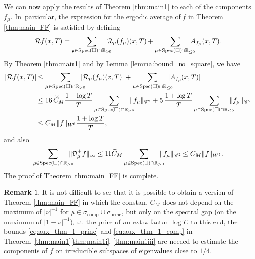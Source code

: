 \documentclass[JEP,XML,SOM,NoEqCountersInSection,Unicode,published]{cedram}
\newcommand \R{\mathbb{R}}
\newcommand{\Dpm}[1]{\mathcal{D}_\mu^{\pm} #1}
\DeclareMathOperator{\Spec}{Spec}
\DeclareMathOperator{\comp}{comp}
\DeclareMathOperator{\princ}{princ}
\theoremstyle{definition}
\newtheorem{remark}[theorem]{Remark}
\begin{document}
We can now apply the results of Theorem \ref{thm:main1} to each of the components $f_\mu$.
In~particular, the expression for the ergodic average of $f$ in Theorem \ref{thm:main_FF} is satisfied by defining
\[
\mathcal{R}f(x,T) = \sum_{\mu \in \Spec(\square) \cap \R_{>0}}\hspace*{-3mm} \mathcal{R}_\mu (f_\mu) (x, T) + \sum_{\mu \in \Spec(\square) \cap \R_{\leq 0}}\hspace*{-3mm} A_{f_\mu}(x,T).
\]
By Theorem \ref{thm:main1} and by Lemma \ref{lemma:bound_no_square}, we have
\begin{equation*}
\begin{split}
|\mathcal{R}f(x,T)|&\leq \sum_{\mu \in \Spec(\square) \cap \R_{>0}}\hspace*{-3mm} |\mathcal{R}_\mu (f_\mu)(x, T)|+ \sum_{\mu \in \Spec(\square) \cap \R_{\leq 0}}\hspace*{-3mm} |A_{f_\mu}(x,T)|\\
&\leq 16 \, {\widetilde C_M} \frac{1+ \log T}{T} \sum_{\mu \in \Spec(\square) \cap \R_{>0}}\hspace*{-3mm} \|f_\mu\|_{\mathscr{C}^2}+ 5\, \frac{1+\log T}{T} \sum_{\mu \in \Spec(\square) \cap \R_{\leq 0}}\hspace*{-3mm} \|f_\mu\|_{\mathscr{C}^2} \\
&\leq C_M\|f \|_{W^6} \frac{1+ \log T}{T},
\end{split}
\end{equation*}
and also
\[
\sum_{\mu \in \Spec(\square) \cap \R_{>0}}\hspace*{-3mm} \|\Dpm{f}\|_{\infty} \leq 11 {\widetilde C_M} \sum_{\mu \in \Spec(\square) \cap \R_{>0}}\hspace*{-3mm}\|f_\mu \|_{\mathscr{C}^2} \leq C_M \|f \|_{W^6}.
\]
The proof of Theorem \ref{thm:main_FF} is complete.

\begin{remark}
It is not difficult to see that it is possible to obtain a version of Theorem \ref{thm:main_FF} in which the constant $C_M$ does not depend on the maximum of $|\nu|^{-1}$ for $\mu \in \sigma_{\comp} \cup \sigma_{\princ}$, but only on the spectral gap (\ie on the maximum of \hbox{$|1-\nu|^{-1}$}), at~the price of an extra factor $\log T$: to this end, the bounds \eqref{eq:aux_thm_1_princ} and \eqref{eq:aux_thm_1_comp} in Theorem~\ref{thm:main1}\eqref{thm:main1i}, \eqref{thm:main1iii} are needed to estimate the components of $f$ on irreducible subspaces of eigenvalues close to $1/4$.
\end{remark}
\end{document}
